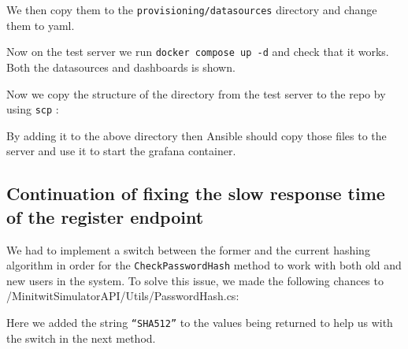 We then copy them to the \texttt{provisioning/datasources} directory and change them to yaml.

Now on the test server we run \texttt{docker\ compose\ up\ -d} and check that it works. Both the datasources and dashboards is shown.

Now we copy the structure of the directory from the test server to the repo by using \texttt{scp} :


By adding it to the above directory then Ansible should copy those files to the server and use it to start the grafana container.

\subsection{Continuation of fixing the slow response time of the register endpoint}
\label{log:continuation-of-fixing-the-slow-response-time-of-the-register-endpoint}

We had to implement a switch between the former and the current hashing algorithm in order for the \texttt{CheckPasswordHash} method to work with both old and new users in the system. To solve this issue, we made the following chances to /MinitwitSimulatorAPI/Utils/PasswordHash.cs:


Here we added the string \texttt{“SHA512”} to the values being returned to help us with the switch in the next method.

